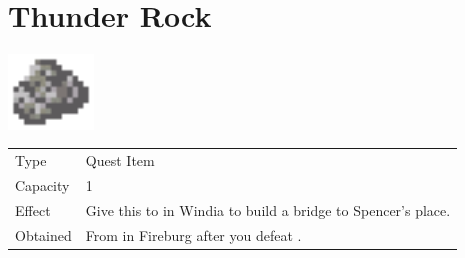 \section{Thunder Rock}
\label{item:thunder_rock}

\includegraphics[height=2cm,keepaspectratio]{./resources/items/thunderrock}

\begin{longtable}{ l p{9cm} }
	Type
	& Quest Item
\\ %
	Capacity
	& 1
\\ %
	Effect
	& Give this to \nameref{char:otto} in Windia to build a bridge to Spencer’s place.
\\ %
	Obtained
	& From \nameref{char:arion} in Fireburg after you defeat \nameref{monster:pazuzu}.
\end{longtable}
